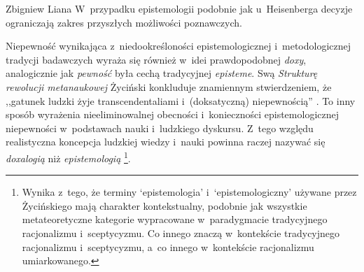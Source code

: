 \begin{artplenv}{Zbigniew Liana}
W~przypadku epistemologii podobnie jak u~Heisenberga decyzje ograniczają zakres przyszłych możliwości poznawczych.

Niepewność wynikająca z~niedookreśloności epistemologicznej i~metodologicznej tradycji badawczych wyraża się również w~idei prawdopodobnej \textit{doxy}, analogicznie jak \textit{pewność} była cechą tradycyjnej \textit{episteme}. Swą \textit{Strukturę rewolucji metanaukowej} Życiński konkluduje znamiennym stwierdzeniem, że ,,gatunek ludzki żyje transcendentaliami i~(doksatyczną) niepewnością''
\parencites[][s.~204]{zycinski_structure_1988}[][s.~354]{zycinski_struktura_2013_liana}. %
 To inny sposób wyrażenia nieeliminowalnej obecności i~konieczności epistemologicznej niepewności w~podstawach nauki i~ludzkiego dyskursu. Z~tego względu realistyczna koncepcja ludzkiej wiedzy i~nauki powinna raczej nazywać się \textit{doxalogią} niż \textit{epistemologią} 
\parencites[][s.~227]{zycinski_teizm_1985}[][s.~305]{zycinski_structure_1988}[][s.~305]{zycinski_struktura_2013_liana}[][s.~129]{zycinski_elementy_1996}[][s.~174]{zycinski_elementy_2015}%
\footnote{Wynika z~tego, że terminy ‘epistemologia' i~‘epistemologiczny' używane przez Życińskiego mają charakter kontekstualny, podobnie jak wszystkie metateoretyczne kategorie wypracowane w~paradygmacie tradycyjnego racjonalizmu i~sceptycyzmu. Co innego znaczą w~kontekście tradycyjnego racjonalizmu i~sceptycyzmu, a~co innego w~kontekście racjonalizmu umiarkowanego.}.


\end{artplenv}
